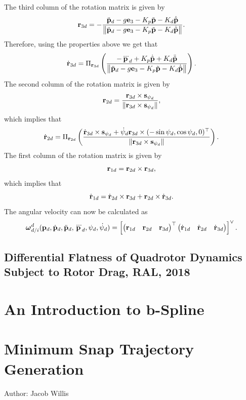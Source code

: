 The third column of the rotation matrix is given by
\begin{equation}
	\mathbf{r}_{3d} = - \frac{\ddot{\mathbf{p}}_d - g \mathbf{e}_3 - K_p \tilde{\mathbf{p}} - K_d \dot{\tilde{\mathbf{p}}}} {\left\|\ddot{\mathbf{p}}_d - g \mathbf{e}_3 - K_p \tilde{\mathbf{p}} - K_d \dot{\tilde{\mathbf{p}}}\right\|}.
\end{equation}
Therefore, using the properties above we get that
\[
\dot{\mathbf{r}}_{3d} = \Pi_{\mathbf{r}_{3d}} \left(\frac{-\dddot{\mathbf{p}}_d + K_p \dot{\tilde{\mathbf{p}}} + K_d \ddot{\tilde{\mathbf{p}}}}{\left\|\ddot{\mathbf{p}}_d - g \mathbf{e}_3 - K_p \tilde{\mathbf{p}} - K_d \dot{\tilde{\mathbf{p}}}\right\|}\right).
\]
The second column of the rotation matrix is given by
\[
\mathbf{r}_{2d} = \frac{\mathbf{r}_{3d}\times\mathbf{s}_{\psi_d}}{\left\|\mathbf{r}_{3d}\times\mathbf{s}_{\psi_d}\right\|},
\]
which implies that
\[
\dot{\mathbf{r}}_{2d} = \Pi_{\mathbf{r}_{2d}}\left(\frac{\dot{\mathbf{r}}_{3d}\times\mathbf{s}_{\psi_d}+\dot{\psi}_d\mathbf{r}_{3d}\times (-\sin\psi_d,  \cos\psi_d, 0)^\top }{\left\|\mathbf{r}_{3d}\times\mathbf{s}_{\psi_d}\right\|}\right).
\]
The first column of the rotation matrix is given by
\[
\mathbf{r}_{1d} = \mathbf{r}_{2d}\times\mathbf{r}_{3d},
\]
which implies that
\[
\dot{\mathbf{r}}_{1d} = \dot{\mathbf{r}}_{2d}\times\mathbf{r}_{3d} + \mathbf{r}_{2d}\times \dot{\mathbf{r}}_{3d}.
\]
The angular velocity can now be calculated as
\[
\boldsymbol{\omega}_{d/i}^d(\mathbf{p}_d, \dot{\mathbf{p}}_d, \ddot{\mathbf{p}}_d, \dddot{\mathbf{p}}_d, \psi_d, \dot{\psi}_d) = \left[\begin{pmatrix}\mathbf{r}_{1d} & \mathbf{r}_{2d} & \mathbf{r}_{3d}\end{pmatrix}^\top \begin{pmatrix} \dot{\mathbf{r}}_{1d} & \dot{\mathbf{r}}_{2d} & \dot{\mathbf{r}}_{3d} \end{pmatrix}\right]^\vee.
\]

\subsection{Differential Flatness of Quadrotor Dynamics Subject to Rotor Drag, RAL, 2018}





\section{An Introduction to b-Spline}



\section{Minimum Snap Trajectory Generation}
Author:  Jacob Willis

